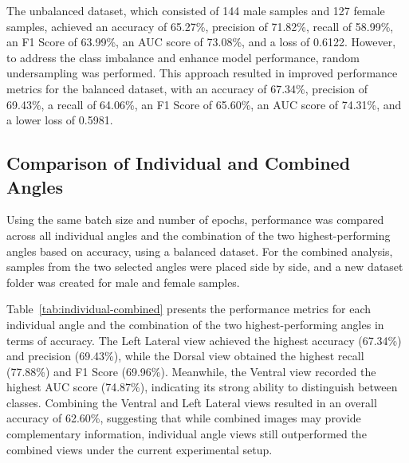 The unbalanced dataset, which consisted of 144 male samples and 127 female samples, achieved an accuracy of 65.27\%, precision of 71.82\%, recall of 58.99\%, an F1 Score of 63.99\%, an AUC score of 73.08\%, and a loss of 0.6122. However, to address the class imbalance and enhance model performance, random undersampling was performed. This approach resulted in improved performance metrics for the balanced dataset, with an accuracy of 67.34\%, precision of 69.43\%, a recall of 64.06\%, an F1 Score of 65.60\%, an AUC score of 74.31\%, and a lower loss of 0.5981.

\begin{table}[H]
	\centering
	\caption{Performance metrics for balanced vs imbalanced datasets (Batch Size: 16, Epochs: 20).}
	\label{tab:unbalanced-balanced}
\end{table}

\subsection{Comparison of Individual and Combined Angles}

Using the same batch size and number of epochs, performance was compared across all individual angles and the combination of the two highest-performing angles based on accuracy, using a balanced dataset. For the combined analysis, samples from the two selected angles were placed side by side, and a new dataset folder was created for male and female samples. 

Table~\ref{tab:individual-combined} presents the performance metrics for each individual angle and the combination of the two highest-performing angles in terms of accuracy. The Left Lateral view achieved the highest accuracy (67.34\%) and precision (69.43\%), while the Dorsal view obtained the highest recall (77.88\%) and F1 Score (69.96\%). Meanwhile, the Ventral view recorded the highest AUC score (74.87\%), indicating its strong ability to distinguish between classes.
Combining the Ventral and Left Lateral views resulted in an overall accuracy of 62.60\%, suggesting that while combined images may provide complementary information, individual angle views still outperformed the combined views under the current experimental setup.

